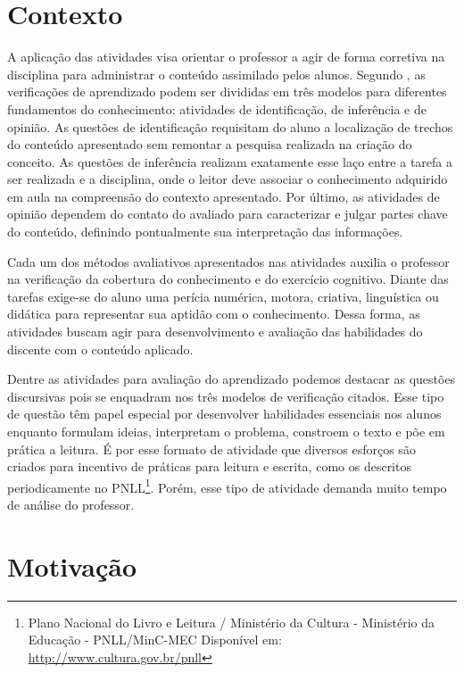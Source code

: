 \section{Contexto}\label{contexto}

A aplicação das atividades visa orientar o professor a agir de forma corretiva na disciplina para administrar o conteúdo assimilado pelos alunos. Segundo , as verificações de aprendizado podem ser divididas em três modelos para diferentes fundamentos do conhecimento: atividades de identificação, de inferência e de opinião. As questões de identificação requisitam do aluno a localização de trechos do conteúdo apresentado sem remontar a pesquisa realizada na criação do conceito. As questões de inferência realizam exatamente esse laço entre a tarefa a ser realizada e a disciplina, onde o leitor deve associar o conhecimento adquirido em aula na compreensão do contexto apresentado. Por último, as atividades de opinião dependem do contato do avaliado para caracterizar e julgar partes chave do conteúdo, definindo pontualmente sua interpretação das informações. 

Cada um dos métodos avaliativos apresentados nas atividades auxilia o professor na verificação da cobertura do conhecimento e do exercício cognitivo. Diante das tarefas exige-se do aluno uma perícia numérica, motora, criativa, linguística ou didática para representar sua aptidão com o conhecimento. Dessa forma, as atividades buscam agir para desenvolvimento e avaliação das habilidades do discente com o conteúdo aplicado. 

Dentre as atividades para avaliação do aprendizado podemos destacar as questões discursivas pois se enquadram nos três modelos de verificação citados. Esse tipo de questão têm papel especial por desenvolver habilidades essenciais nos alunos enquanto formulam ideias, interpretam o problema, constroem o texto e põe em prática a leitura. É por esse formato de atividade que diversos esforços são criados para incentivo de práticas para leitura e escrita, como os descritos periodicamente no PNLL\footnote{Plano Nacional do Livro e Leitura / Ministério da Cultura - Ministério da Educação - PNLL/MinC-MEC Disponível em: \url{http://www.cultura.gov.br/pnll}}. Porém, esse tipo de atividade demanda muito tempo de análise do professor.

\section{Motivação}


